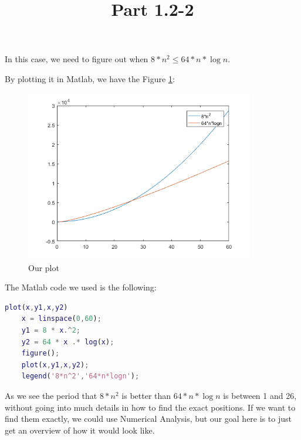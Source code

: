 \documentclass{article}
\title{Part 1.2-2}
\begin{document}
\date{}
\author{}

\maketitle

In this case, we need to figure out when $ 8 * n^{2} \leq 64* n * \log{n} $.

By plotting it in Matlab, we have the Figure \ref{fig:plot1}:

\begin{figure}
    \includegraphics[width=10cm]{images/1-2-2.png}
    \centering
    \caption{Our plot}
    \label{fig:plot1}
\end{figure}

The Matlab code we used is the following:

\begin{lstlisting}[language=Matlab]
    plot(x,y1,x,y2)
    x = linspace(0,60);
    y1 = 8 * x.^2;
    y2 = 64 * x .* log(x);
    figure();
    plot(x,y1,x,y2);
    legend('8*n^2','64*n*logn');
\end{lstlisting}

As we see the period that $8*n^{2}$ is better than $64*n*\log{n}$ is between 1 and 26, without going into much details in how to find the exact positions. If we want to find them exactly, we could use Numerical Analysis, but our goal here is to just get an overview of how it would look like.
\end{document}
